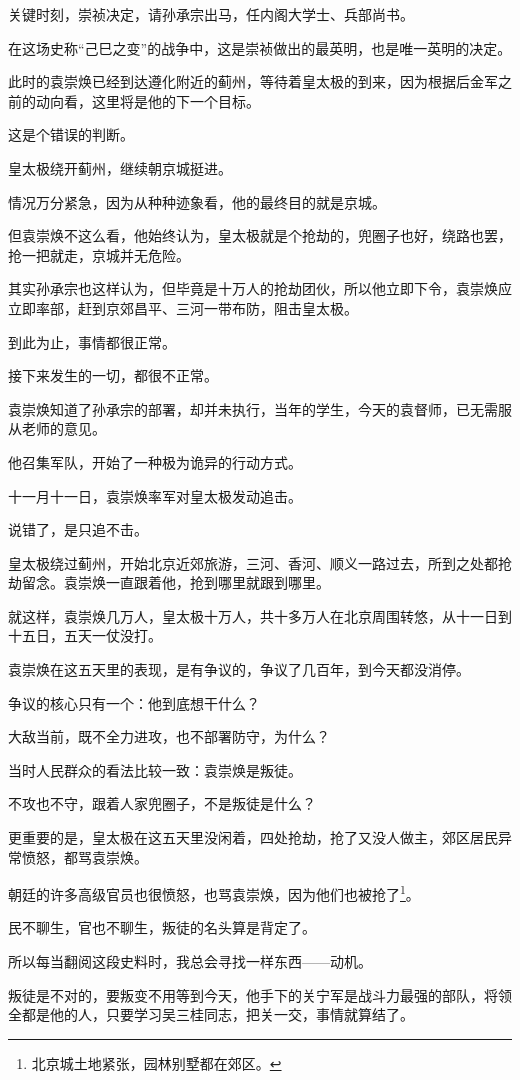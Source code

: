 \begin{multicols}{\theparacolNo}
关键时刻，崇祯决定，请孙承宗出马，任内阁大学士、兵部尚书。

在这场史称“己巳之变”的战争中，这是崇祯做出的最英明，也是唯一英明的决定。

此时的袁崇焕已经到达遵化附近的蓟州，等待着皇太极的到来，因为根据后金军之前的动向看，这里将是他的下一个目标。

这是个错误的判断。

皇太极绕开蓟州，继续朝京城挺进。

情况万分紧急，因为从种种迹象看，他的最终目的就是京城。

但袁崇焕不这么看，他始终认为，皇太极就是个抢劫的，兜圈子也好，绕路也罢，抢一把就走，京城并无危险。

其实孙承宗也这样认为，但毕竟是十万人的抢劫团伙，所以他立即下令，袁崇焕应立即率部，赶到京郊昌平、三河一带布防，阻击皇太极。

到此为止，事情都很正常。

接下来发生的一切，都很不正常。

袁崇焕知道了孙承宗的部署，却并未执行，当年的学生，今天的袁督师，已无需服从老师的意见。

他召集军队，开始了一种极为诡异的行动方式。

十一月十一日，袁崇焕率军对皇太极发动追击。

说错了，是只追不击。

皇太极绕过蓟州，开始北京近郊旅游，三河、香河、顺义一路过去，所到之处都抢劫留念。袁崇焕一直跟着他，抢到哪里就跟到哪里。

就这样，袁崇焕几万人，皇太极十万人，共十多万人在北京周围转悠，从十一日到十五日，五天一仗没打。

袁崇焕在这五天里的表现，是有争议的，争议了几百年，到今天都没消停。

争议的核心只有一个：他到底想干什么？

大敌当前，既不全力进攻，也不部署防守，为什么？

当时人民群众的看法比较一致：袁崇焕是叛徒。

不攻也不守，跟着人家兜圈子，不是叛徒是什么？

更重要的是，皇太极在这五天里没闲着，四处抢劫，抢了又没人做主，郊区居民异常愤怒，都骂袁崇焕。

朝廷的许多高级官员也很愤怒，也骂袁崇焕，因为他们也被抢了\footnote{北京城土地紧张，园林别墅都在郊区。}。

民不聊生，官也不聊生，叛徒的名头算是背定了。

所以每当翻阅这段史料时，我总会寻找一样东西——动机。

叛徒是不对的，要叛变不用等到今天，他手下的关宁军是战斗力最强的部队，将领全都是他的人，只要学习吴三桂同志，把关一交，事情就算结了。


\end{multicols}
